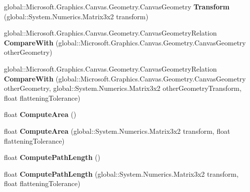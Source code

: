 \begin{DoxyCompactItemize}
global\+::\+Microsoft.\+Graphics.\+Canvas.\+Geometry.\+Canvas\+Geometry {\bfseries Transform} (global\+::\+System.\+Numerics.\+Matrix3x2 transform)
\item 
\mbox{\label{class_microsoft_1_1_graphics_1_1_canvas_1_1_geometry_1_1_canvas_geometry_a4af4b0665650464ff178a62d44d41cd9}} 
global\+::\+Microsoft.\+Graphics.\+Canvas.\+Geometry.\+Canvas\+Geometry\+Relation {\bfseries Compare\+With} (global\+::\+Microsoft.\+Graphics.\+Canvas.\+Geometry.\+Canvas\+Geometry other\+Geometry)
\item 
\mbox{\label{class_microsoft_1_1_graphics_1_1_canvas_1_1_geometry_1_1_canvas_geometry_a46984a998579f41371f806face56cd8a}} 
global\+::\+Microsoft.\+Graphics.\+Canvas.\+Geometry.\+Canvas\+Geometry\+Relation {\bfseries Compare\+With} (global\+::\+Microsoft.\+Graphics.\+Canvas.\+Geometry.\+Canvas\+Geometry other\+Geometry, global\+::\+System.\+Numerics.\+Matrix3x2 other\+Geometry\+Transform, float flattening\+Tolerance)
\item 
\mbox{\label{class_microsoft_1_1_graphics_1_1_canvas_1_1_geometry_1_1_canvas_geometry_aa08eda160516a30cec6d6df2eff63201}} 
float {\bfseries Compute\+Area} ()
\item 
\mbox{\label{class_microsoft_1_1_graphics_1_1_canvas_1_1_geometry_1_1_canvas_geometry_a691883046354446e27838e64d21e99bb}} 
float {\bfseries Compute\+Area} (global\+::\+System.\+Numerics.\+Matrix3x2 transform, float flattening\+Tolerance)
\item 
\mbox{\label{class_microsoft_1_1_graphics_1_1_canvas_1_1_geometry_1_1_canvas_geometry_ac795f5b565a905b8bfbd67e69c327ceb}} 
float {\bfseries Compute\+Path\+Length} ()
\item 
\mbox{\label{class_microsoft_1_1_graphics_1_1_canvas_1_1_geometry_1_1_canvas_geometry_a5ddd0bb4b6fa3da6b55d5cdbfdbea574}} 
float {\bfseries Compute\+Path\+Length} (global\+::\+System.\+Numerics.\+Matrix3x2 transform, float flattening\+Tolerance)

\end{DoxyCompactItemize}
